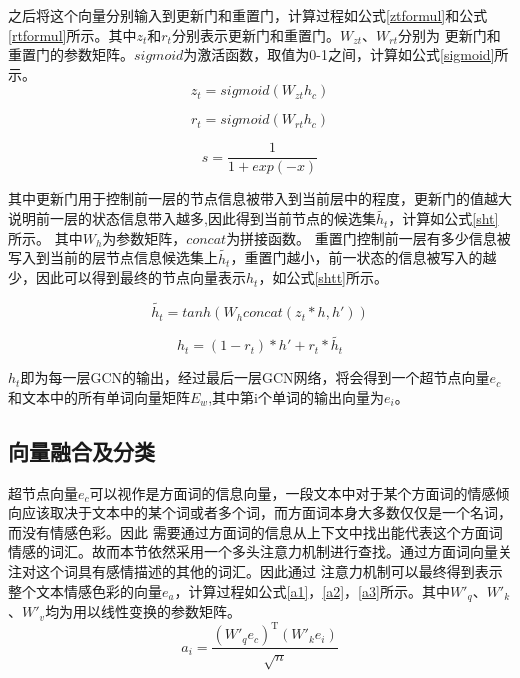 之后将这个向量分别输入到更新门和重置门，计算过程如公式\ref{ztformul}和公式\ref{rtformul}所示。其中$z_t$和$r_t$分别表示更新门和重置门。$W_{zt}$、$W_{rt}$分别为
更新门和重置门的参数矩阵。$sigmoid$为激活函数，取值为0-1之间，计算如公式\ref{sigmoid}所示。
\begin{equation}\label{ztformul}
    z_t = sigmoid(W_{zt}h_c)
\end{equation}

\begin{equation}\label{rtformul}
    r_t = sigmoid(W_{rt}h_c)
\end{equation}

\begin{equation}\label{sigmoid}
    s = \frac{1}{1+exp(-x)}
\end{equation}

其中更新门用于控制前一层的节点信息被带入到当前层中的程度，更新门的值越大说明前一层的状态信息带入越多,因此得到当前节点的候选集$\tilde{h_t}$，计算如公式\ref{sht}所示。
其中$W_h$为参数矩阵，$concat$为拼接函数。
重置门控制前一层有多少信息被写入到当前的层节点信息候选集上$\tilde{h_t}$，重置门越小，前一状态的信息被写入的越少，因此可以得到最终的节点向量表示$h_t$，如公式\ref{shtt}所示。

\begin{equation}\label{sht}
    \tilde{h_t} = tanh(W_hconcat(z_t*h,h'))
\end{equation}

\begin{equation}\label{shtt}
    h_t = (1-r_t)*h'+r_t*\tilde{h_t}
\end{equation}

$h_t$即为每一层GCN的输出，经过最后一层GCN网络，将会得到一个超节点向量$e_c$和文本中的所有单词向量矩阵$E_w$,其中第i个单词的输出向量为$e_i$。

\subsection{向量融合及分类}
超节点向量$e_c$可以视作是方面词的信息向量，一段文本中对于某个方面词的情感倾向应该取决于文本中的某个词或者多个词，而方面词本身大多数仅仅是一个名词，而没有情感色彩。因此
需要通过方面词的信息从上下文中找出能代表这个方面词情感的词汇。故而本节依然采用一个多头注意力机制进行查找。通过方面词向量关注对这个词具有感情描述的其他的词汇。因此通过
注意力机制可以最终得到表示整个文本情感色彩的向量$e_a$，计算过程如公式\ref{a1}，\ref{a2}，\ref{a3}所示。其中$W'_q$、$W'_k$、$W'_v$均为用以线性变换的参数矩阵。
\begin{equation}\label{a1}
    a_i = \frac{(W'_qe_c)^\mathrm{T}(W'_ke_i)}{\sqrt{n}}
\end{equation}

